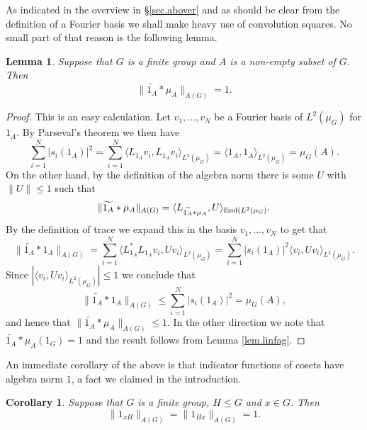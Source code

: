 \documentclass[12pt]{amsart}
\numberwithin{equation}{section}
\theoremstyle{plain}
\newtheorem{lemma}[subsection]{Lemma}
\newtheorem{corollary}[subsection]{Corollary}
\theoremstyle{definition}
\renewcommand{\leq}{\leqslant}
\providecommand{\End}{\mathop{\rm End}\nolimits}
\begin{document}
As indicated in the overview in \S\ref{sec.abover} and as should be clear from the definition of a Fourier basis we shall make heavy use of convolution squares.  No small part of that reason is the following lemma.
\begin{lemma}\label{lem.convag}
Suppose that $G$ is a finite group and $A$ is a non-empty subset of $G$. Then
\begin{equation*}
\|\widetilde{1_A} \ast \mu_A\|_{A(G)} = 1.
\end{equation*}
\end{lemma}
\begin{proof}
This is an easy calculation. Let $v_1,\dots,v_N$ be a Fourier basis of $L^2(\mu_G)$ for $1_A$.  By Parseval's theorem we then have
\begin{equation*}
\sum_{i=1}^N{|s_i(1_A)|^2} = \sum_{i=1}^N{\langle L_{1_A}v_i,L_{1_A}v_i\rangle_{L^2(\mu_G)}} = \langle 1_A, 1_A \rangle_{L^2(\mu_G)} = \mu_G(A).
\end{equation*}
On the other hand, by the definition of the algebra norm there is some $U$ with $\|U\| \leq 1$ such that
\begin{equation*}
\|\widetilde{1_A} \ast \mu_A\|_{A(G)} =\langle L_{\widetilde{1_A} \ast \mu_A},U\rangle_{\End(L^2(\mu_G)}.
\end{equation*}
By the definition of trace we expand this in the basis $v_1,\dots,v_N$ to get that
\begin{equation*}
\|\widetilde{1_A} \ast 1_A\|_{A(G)} =\sum_{i=1}^N{\langle L_{1_A}^*L_{1_A}v_i,Uv_i\rangle_{L^2(\mu_G)}} = \sum_{i=1}^N{|s_i(1_A)|^2\langle v_i,Uv_i\rangle_{L^2(\mu_G)}}.
\end{equation*}
Since $|\langle v_i,Uv_i\rangle_{L^2(\mu_G)}| \leq 1$ we conclude that
\begin{equation*}
\|\widetilde{1_A} \ast 1_A\|_{A(G)} \leq \sum_{i=1}^N{|s_i(1_A)|^2} = \mu_G(A),
\end{equation*}
and hence that $\|\widetilde{1_A} \ast \mu_A\|_{A(G)} \leq 1$. In the other direction we note that $\widetilde{1_A} \ast \mu_A(1_G) = 1$ and the result follows from Lemma \ref{lem.linfag}.
 \end{proof}
 An immediate corollary of the above is that indicator functions of cosets have algebra norm $1$, a fact we claimed in the introduction.
 \begin{corollary}\label{cor.indsmall}
Suppose that $G$ is a finite group, $H \leq G$ and $x \in G$. Then
\begin{equation*}
\|1_{xH}\|_{A(G)} =\|1_{Hx}\|_{A(G)}=1.
\end{equation*}
\end{corollary}
\end{document}
